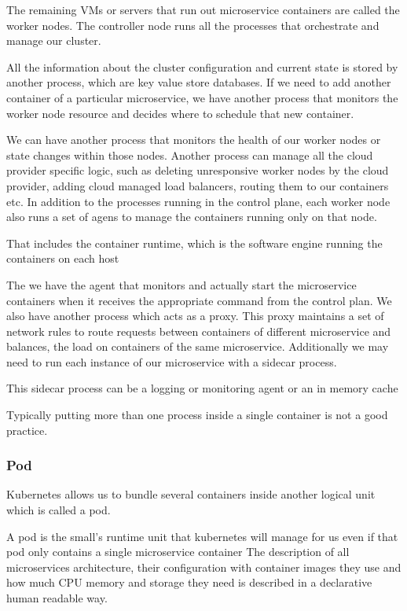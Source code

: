 \documentclass[a4paper, 11pt]{book}
\begin{document}
    The remaining VMs or servers that run out microservice containers are called the worker nodes.
    The controller node runs all the processes that orchestrate and manage our cluster.

    All the information about the cluster configuration and current state is stored by another process, which are key value store databases.
    If we need to add another container of a particular microservice, we have another process that monitors the worker node resource and decides where to schedule that new container.

    We can have another process that monitors the health of our worker nodes or state changes within those nodes.
    Another process can manage all the cloud provider specific logic, such as deleting unresponsive worker nodes by the cloud provider, adding cloud managed load balancers, routing them to our containers etc.
    In addition to the processes running in the control plane, each worker node also runs a set of agens to manage the containers running only on that node.

    That includes the container runtime, which is the software engine running the containers on each host

    The we have the agent that monitors and actually start the microservice containers when it receives the appropriate command from the control plan.
    We also have another process which acts as a proxy.
    This proxy maintains a set of network rules to route requests between containers of different microservice and balances, the load on containers of the same microservice.
    Additionally we may need to run each instance of our microservice with a sidecar process.

    This sidecar process can be a logging or monitoring agent or an in memory cache

    Typically putting more than one process inside a single container is not a good practice.

    \subsubsection{Pod}
    Kubernetes allows us to bundle several containers inside another logical unit which is called a pod.

    A pod is the small's runtime unit that kubernetes will manage for us even if that pod only contains a single microservice container
    The description of all microservices architecture, their configuration with container images they use and how much CPU memory and storage they need is described in a declarative human readable way.
\end{document}
